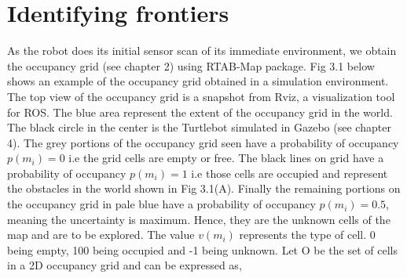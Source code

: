 \section{Identifying frontiers}
As the robot does its initial sensor scan of its immediate environment, we obtain the occupancy grid (see chapter 2) using RTAB-Map package. Fig 3.1 below shows an example of the occupancy grid obtained in a simulation environment. The top view of the occupancy grid is a snapshot from Rviz, a visualization tool for ROS. The blue area represent the extent of the occupancy grid in the world. The black circle in the center is the Turtlebot simulated in Gazebo (see chapter 4). The grey portions of the occupancy grid seen have a probability of occupancy $p(m_i) = 0$ i.e the grid cells are empty or free. The black lines on grid have a probability of occupancy $p(m_i) = 1$ i.e those cells are occupied and represent the obstacles in the world shown in Fig 3.1(A). Finally the remaining portions on the occupancy grid in pale blue have a probability of occupancy $p(m_i) = 0.5$, meaning the uncertainty is maximum. Hence, they are the unknown cells of the map and are to be explored. The value $v(m_i)$ represents the type of cell. 0 being empty, 100 being occupied and -1 being unknown. Let O be the set of cells in a 2D occupancy grid and can be expressed as,

